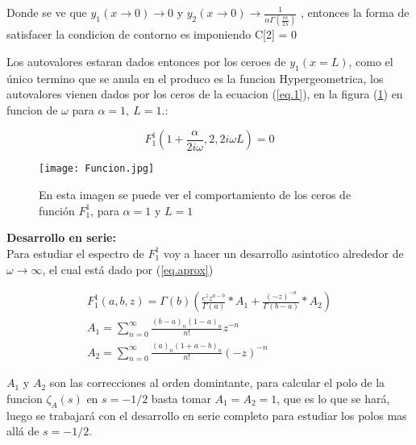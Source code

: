 Donde se ve que $y _1 (x \rightarrow 0 ) \rightarrow 0$ y $y _2 (x \rightarrow 0)  \rightarrow
\frac{1}{  \alpha   \Gamma ( \frac{i \alpha}{2 \lambda}  )   } $ , entonces la forma de satisfacer la condicion de contorno es imponiendo C[2] = 0

Los autovalores estaran dados entonces por los ceroes de $y_1 (x= L)$, como el único termino que se anula en el produco es la funcion Hypergeometrica, los autovalores vienen dados por los ceros de la ecuacion (\ref{eq.1}), en la figura (\ref{fig:funcion}) en funcion de $\omega$ para  $\alpha=1, \ L=1$.:


\begin{equation}
F _1 ^1 (1+\frac{ \alpha}{2 i \omega},2,2 i \omega L)  = 0
\label{eq.1}
\end{equation}

\begin{figure}
\centering
\texttt{[image: Funcion.jpg]}
\caption{En esta imagen se puede ver el comportamiento de los ceros de función $F _1 ^1$, para $\alpha=1$ y $L=1$}
\label{fig:funcion}
\end{figure}

\textbf{Desarrollo en serie:} \\

Para estudiar el espectro de $F _1 ^1$ voy a hacer un desarrollo asintotico alrededor de $\omega \rightarrow \infty$, el cual está dado por (\ref{eq.aprox})


\begin{equation}
\begin{array}{c}
    F _1 ^1 (a,b,z) = \Gamma (b) 
    \left(
    \frac{e^z z ^{a-b} }{\Gamma(a)} * A_1 + \frac{(-z) ^{ -a}}{ \Gamma(b-a)} 
    * A_2
    \right) \\ 
    A _1 = \sum _{n=0} ^{\infty} \frac{(b-a) _n (1-a) _n}{n!} z ^{-n} \\ 
    A _2 = \sum _{n=0} ^{\infty} \frac{(a) _n (1+a-b) _n}{n!} (-z) ^{-n}
    
\end{array}
\label{eq.aprox}
\end{equation}

$A_1$ y $A _2$ son las correcciones al orden domintante, para calcular el polo de la funcion $\zeta _A (s)$ en $s=-1/2$ basta tomar $A _1 = A _2 = 1$, que es lo que se hará, luego se trabajará con el desarrollo en serie completo para estudiar los polos mas allá de $s=-1/2$. 


